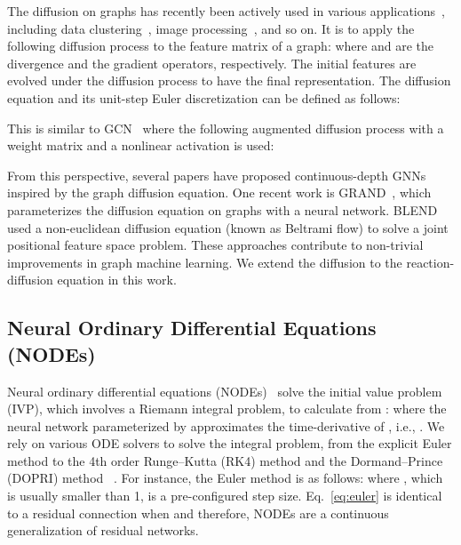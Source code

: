 \documentclass{article}
\theoremstyle{plain}
\theoremstyle{definition}
\theoremstyle{remark}
\begin{document}
The diffusion on graphs has recently been actively used in various applications~\cite{freidlin1993diffusion,freidlin2000diffusion}, including data clustering~\cite{belkin2003laplacian,coifman2005geometric}, image processing~\cite{desquesnes2013eikonal,elmoataz2008nonlocal,gilboa2009nonlocal}, and so on. It is to apply the following diffusion process to the feature matrix  of a graph:
where  and  are the divergence and the gradient operators, respectively. The initial features are evolved under the diffusion process to have the final representation. The diffusion equation and its unit-step Euler discretization can be defined as follows:


This is similar to GCN~\cite{kipf2017GCN} where the following augmented diffusion process with a weight matrix  and a nonlinear activation  is used:


From this perspective, several papers have proposed continuous-depth GNNs~\cite{wang2021dgc,choi2021ltocf,hwang2021climate,thorpe2022grands,choi2023climate} inspired by the graph diffusion equation. One recent work is GRAND~\cite{chamberlain2021grand}, which parameterizes the diffusion equation on graphs with a neural network. BLEND~\cite{chamberlain2021blend} used a non-euclidean diffusion equation (known as Beltrami flow) to solve a joint positional feature space problem. These approaches contribute to non-trivial improvements in graph machine learning. We extend the diffusion to the reaction-diffusion equation in this work.



\subsection{Neural Ordinary Differential Equations (NODEs)}
Neural ordinary differential equations (NODEs)~\cite{chen2018NODE} solve the initial value problem (IVP), which involves a Riemann integral problem, to calculate  from :
where the neural network parameterized by  approximates the time-derivative of , i.e., . We rely on various ODE solvers to solve the integral problem, from the explicit Euler method to the 4th order Runge--Kutta (RK4) method and the Dormand--Prince (DOPRI) method ~\cite{dormand1980dopri}. For instance, the Euler method is as follows:
where , which is usually smaller than 1, is a pre-configured step size. Eq.~\eqref{eq:euler} is identical to a residual connection when  and therefore, NODEs are a continuous generalization of residual networks.
\end{document}
